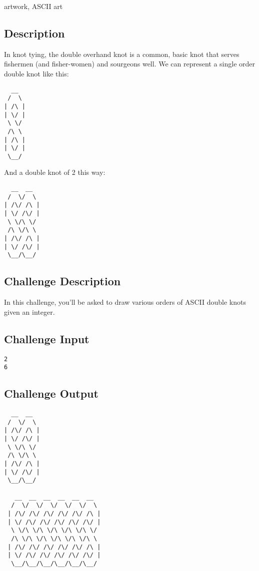 artwork, ASCII art

\subsection{Description}\label{description-22}

In knot tying, the double overhand knot is a common, basic knot that
serves fishermen (and fisher-women) and sourgeons well. We can represent
a single order double knot like this:

\begin{verbatim}
  __
 /  \
| /\ |
| \/ |
 \ \/
 /\ \
| /\ |
| \/ |
 \__/
\end{verbatim}

And a double knot of 2 this way:

\begin{verbatim}
  __  __ 
 /  \/  \
| /\/ /\ |
| \/ /\/ |
 \ \/\ \/
 /\ \/\ \
| /\/ /\ |
| \/ /\/ |
 \__/\__/
\end{verbatim}

\subsection{Challenge Description}\label{challenge-description-1}

In this challenge, you'll be asked to draw various orders of ASCII
double knots given an integer.

\subsection{Challenge Input}\label{challenge-input-16}

\begin{verbatim}
2
6
\end{verbatim}

\subsection{Challenge Output}\label{challenge-output-13}

\begin{verbatim}
  __  __ 
 /  \/  \
| /\/ /\ |
| \/ /\/ |
 \ \/\ \/
 /\ \/\ \
| /\/ /\ |
| \/ /\/ |
 \__/\__/

   __  __  __  __  __  __
  /  \/  \/  \/  \/  \/  \
 | /\/ /\/ /\/ /\/ /\/ /\ |
 | \/ /\/ /\/ /\/ /\/ /\/ |
  \ \/\ \/\ \/\ \/\ \/\ \/
  /\ \/\ \/\ \/\ \/\ \/\ \
 | /\/ /\/ /\/ /\/ /\/ /\ |
 | \/ /\/ /\/ /\/ /\/ /\/ |
  \__/\__/\__/\__/\__/\__/
\end{verbatim}

